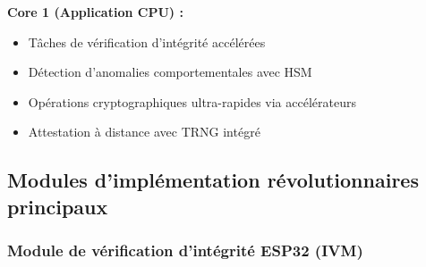 \textbf{Core 1 (Application CPU) :}
\begin{itemize}
    \item Tâches de vérification d'intégrité accélérées
    \item Détection d'anomalies comportementales avec HSM
    \item Opérations cryptographiques ultra-rapides via accélérateurs
    \item Attestation à distance avec TRNG intégré
\end{itemize}

\subsection{Modules d'implémentation révolutionnaires principaux}

\subsubsection{Module de vérification d'intégrité ESP32 (IVM)}

